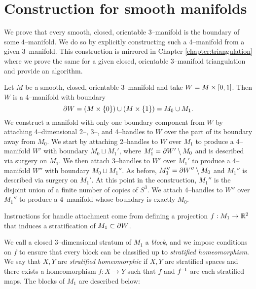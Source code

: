 \chapter{Construction for smooth manifolds}
\label{chapter:smooth}

We prove that every smooth, closed, orientable 3--manifold is the boundary of some 4--manifold.
We do so by explicitly constructing such a 4--manifold from a given 3--manifold.
This construction is mirrored in Chapter \ref{chapter:triangulation} where we prove the same for a given closed, orientable 3--manifold triangulation and provide an algorithm.

Let $M$ be a smooth, closed, orientable 3--manifold and take $W=M\times [0,1]$.
Then $W$ is a 4--manifold with boundary
\[
	\partial W = (M\times\{0\}) \cup (M\times\{1\}) = M_0 \cup M_1.
\]
We construct a manifold with only one boundary component from $W$ by attaching 4--dimensional 2--, 3--, and 4--handles to $W$ over the part of its boundary away from $M_0$.
We start by attaching 2--handles to $W$ over $M_1$ to produce a 4--manifold $W'$ with boundary $M_0 \sqcup M_1'$, where $M_1'=\partial W'\setminus M_0$ and is described via surgery on $M_1$.
We then attach 3--handles to $W'$ over $M_1'$ to produce a 4--manifold $W''$ with boundary $M_0\sqcup M_1''$.
As before, $M_1''=\partial W''\setminus M_0$ and $M_1''$ is described via surgery on $M_1'$.
At this point in the construction, $M_1''$ is the disjoint union of a finite number of copies of $S^3$.
We attach 4--handles to $W''$ over $M_1''$ to produce a 4--manifold whose boundary is exactly $M_0$.

Instructions for handle attachment come from defining a projection $f:M_1\to \mathbb{R}^2$ that induces a stratification of $M_1\subset\partial W$.

%
%
We call a closed 3--dimensional stratum of $M_1$ a \emph{block}, and we impose conditions on $f$ to ensure that every block can be classified up to \emph{stratified homeomorphism}.
We say that $X,Y$ are \emph{stratified homeomorphic} if $X,Y$ are stratified spaces and there exists a homeomorphism $f:X\to Y$ such that $f$ and $f^{\,\text{-}1}$ are each stratified maps.
The blocks of $M_1$ are described below:


